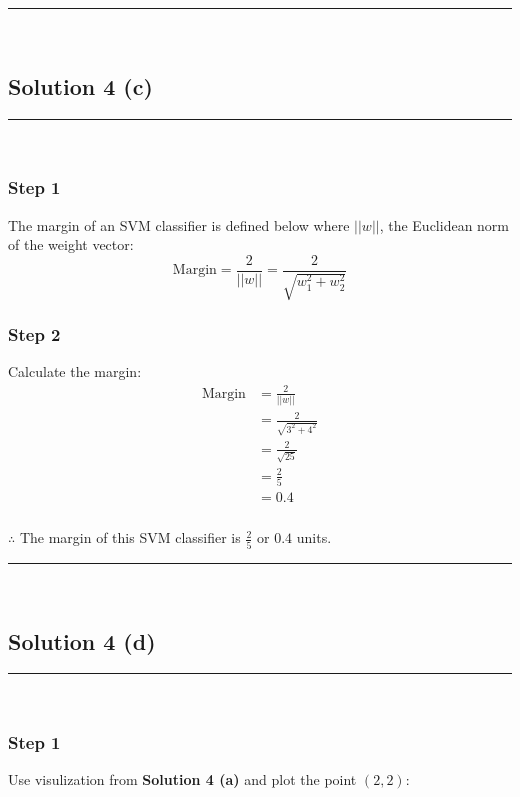 \documentclass{article}
\begin{document}
\noindent\rule{\textwidth}{0.4pt}\\

\newpage

\subsection*{Solution 4 (c)}
\noindent\rule{\textwidth}{0.4pt}\\

\subsubsection*{Step 1}
\parbox{\textwidth}{
The margin of an SVM classifier is defined below where $||w||$, the Euclidean norm of the weight vector:
$$\text{Margin} = \frac{2}{||w||} = \frac{2}{\sqrt{w_1^2 + w_2^2}}$$
}

\subsubsection*{Step 2}
\parbox{\textwidth}{
Calculate the margin:
\begin{align*}
\text{Margin} &= \frac{2}{||w||}\\
&= \frac{2}{\sqrt{3^2 + 4^2}}\\
&= \frac{2}{\sqrt{25}}\\
&= \frac{2}{5}\\
&= 0.4
\end{align*}
}

\subsubsection*{\normalfont}{$\therefore$ The margin of this SVM classifier is $\frac{2}{5}$ or  $0.4$ units.}

\noindent\rule{\textwidth}{0.4pt}\\

\newpage

\subsection*{Solution 4 (d)}
\noindent\rule{\textwidth}{0.4pt}\\

\subsubsection*{Step 1}
\parbox{\textwidth}{
Use visulization from \textbf{Solution 4 (a)} and plot the point $(2,2)$:
}
\end{document}
